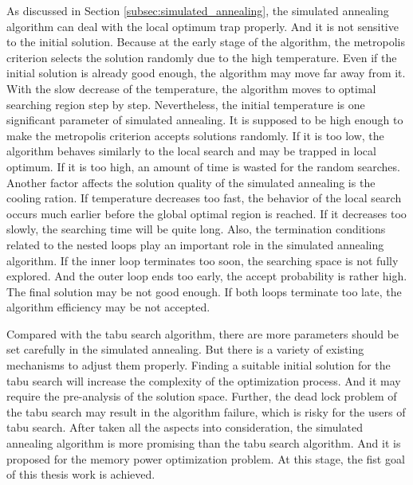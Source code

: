 	As discussed in Section \ref{subsec:simulated_annealing}, the simulated
	annealing algorithm can deal with the local optimum trap properly.
	And it is not sensitive to the initial solution. Because at the early
	stage of the algorithm, the metropolis criterion selects the solution
	randomly due to the high temperature. Even if the initial solution is
	already good enough, the algorithm may move far away from it. With the
	slow decrease of the temperature, the algorithm moves to optimal searching
	region step by step.
	Nevertheless, the initial temperature is one significant parameter of
	simulated annealing. It is supposed to be high enough to make the metropolis criterion accepts solutions randomly. If it is too low, the algorithm
	behaves similarly to the local search and may be trapped in local optimum.
	If it is too high, an amount of time is wasted for the random searches.
	Another factor affects the solution quality of the simulated annealing is the cooling ration. If temperature decreases too fast, the behavior of the local
	search occurs much earlier before the global optimal region is reached.
	If it decreases too slowly, the searching time will be quite long.
	Also, the termination conditions related to the nested loops play an important
	role in the simulated annealing algorithm. If the inner loop terminates too
	soon, the searching space is not fully explored. And the outer loop ends too
	early, the accept probability is rather high. The final solution may be not
	good enough. If both loops terminate too late, the algorithm efficiency may
	be not accepted.
	
	Compared with the tabu search algorithm, there are more parameters should be set carefully in the simulated annealing. But there is a variety of existing mechanisms to adjust them properly. Finding a suitable initial solution for the tabu search will increase the complexity of the optimization process.
	And it may require the pre-analysis of the solution space. Further, the
	dead lock problem of the tabu search may result in the algorithm failure,
	which is risky for the users of tabu search. After taken all the
	aspects into consideration, the simulated annealing algorithm is more
	promising than the tabu search algorithm. And it is proposed for the memory
	power optimization problem. At this stage, the fist goal of this thesis work
	is achieved.